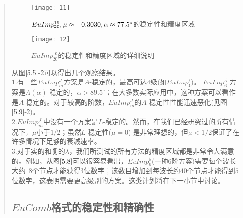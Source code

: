 \documentclass{article}
\begin{document}
\begin{CJK}{UTF8}{gkai}
\begin{quotation}
\begin{figure}[htbp]
{\begin{minipage}{6cm}
			\label{5.10}
		\end{minipage}
	}
\end{figure}
\begin{figure}[htbp]
{
		\begin{minipage}{6cm}
			\centering
			\texttt{[image: 11]}
			\caption{$EuImp_{20}^{19},\mu \approx -0.3030,\\ \alpha \approx 77.5^{\circ}$的稳定性和精度区域}
			\label{5.11}
		\end{minipage}
	}
{
		\begin{minipage}{6cm}
			\centering
			\texttt{[image: 12]}
			\caption{$EuImp_{20}^{19}$的稳定性和精度区域的详细说明}
			\label{5.12}
		\end{minipage}
	}
\end{figure}
从图\ref{5.5}-\ref{5.12}可以得出几个观察结果。\\

$1$.有一些$EuImp^{J}_{m}$方案是$A$-稳定的，最高可达$4$级(如$EuImp^3_4$)。 $EuImp^5_6$ 方案是$A(\alpha)$-稳定的，$\alpha >89.5^{\circ}$；在大多数实际应用中，这种方案可以看作是$A$-稳定的。对于较高的阶数，$EuImp^{J}_{m}$的$A$-稳定性性能迅速恶化(见图\ref{5.9}-\ref{5.12})。\\

$2$.$EuImp^{J}_{m}$中没有一个方案是$L$-稳定的。然而，在我们已经研究过的所有情况下，$\mu$小于$1/2$；虽然$L$-稳定性($\mu=0$) 是非常理想的，但$\mu<1/2$保证了在许多情况下足够的衰减速率。\\

$3$.对于实的和复的$\lambda$，我们所测试的所有方法的精度区域都是非常令人满意的。例如，从图\ref{5.8}可以很容易看出，$EuImp^5_6$(一种$6$阶方案)需要每个波长大约$18$个节点才能获得$3$位数字；该数目增加到每波长约$40$个节点才能得到$5$位数字，这表明需要更高级别的方案。这类计划将在下一小节中讨论。\\
\subsection{$EuComb$格式的稳定性和精确性}


\end{quotation}
\end{CJK}
\end{document}
